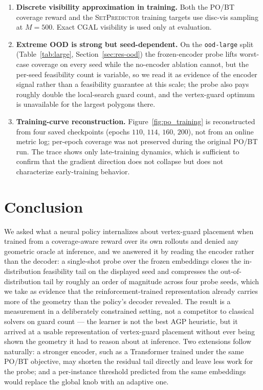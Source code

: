 \documentclass[preprint,10pt]{elsarticle}
\newcommand{\SetPredictor}{\textup{\textsc{SetPredictor}}}
\begin{document}
\begin{enumerate}
  \item \textbf{Discrete visibility approximation in training.} Both the PO/BT coverage reward and the \SetPredictor{} training targets use disc-vis sampling at $M = 500$. Exact CGAL visibility is used only at evaluation.
  \item \textbf{Extreme OOD is strong but seed-dependent.} On the \texttt{ood-large} split (Table~\ref{tab:large}, Section~\ref{sec:res-ood}) the frozen-encoder probe lifts worst-case coverage on every seed while the no-encoder ablation cannot, but the per-seed feasibility count is variable, so we read it as evidence of the encoder signal rather than a feasibility guarantee at this scale; the probe also pays roughly double the local-search guard count, and the vertex-guard optimum is unavailable for the largest polygons there.
  \item \textbf{Training-curve reconstruction.} Figure~\ref{fig:po_training} is reconstructed from four saved checkpoints (epochs $110$, $114$, $160$, $200$), not from an online metric log; per-epoch coverage was not preserved during the original PO/BT run. The trace shows only late-training dynamics, which is sufficient to confirm that the gradient direction does not collapse but does not characterize early-training behavior.
\end{enumerate}

\section{Conclusion}
\label{sec:conclusion}

We asked what a neural policy internalizes about vertex-guard placement when trained from a coverage-aware reward over its own rollouts and denied any geometric oracle at inference, and we answered it by reading the encoder rather than the decoder: a single-shot probe over the frozen embeddings closes the in-distribution feasibility tail on the displayed seed and compresses the out-of-distribution tail by roughly an order of magnitude across four probe seeds, which we take as evidence that the reinforcement-trained representation already carries more of the geometry than the policy's decoder revealed. The result is a measurement in a deliberately constrained setting, not a competitor to classical solvers on guard count --- the learner is not the best AGP heuristic, but it arrived at a usable representation of vertex-guard placement without ever being shown the geometry it had to reason about at inference. Two extensions follow naturally: a stronger encoder, such as a Transformer trained under the same PO/BT objective, may shorten the residual tail directly and leave less work for the probe; and a per-instance threshold predicted from the same embeddings would replace the global knob with an adaptive one.
\end{document}
